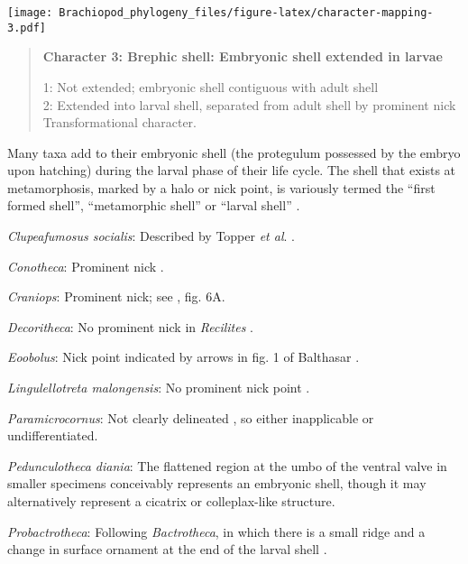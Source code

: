 \documentclass[openany]{book}
\theoremstyle{definition}
\theoremstyle{definition}
\theoremstyle{definition}
\theoremstyle{remark}
\begin{document}
\texttt{[image: Brachiopod\_phylogeny\_files/figure-latex/character-mapping-3.pdf]}

\begin{quote}
\textbf{Character 3: Brephic shell: Embryonic shell extended in larvae}

1: Not extended; embryonic shell contiguous with adult shell\\
2: Extended into larval shell, separated from adult shell by prominent
nick\\
Transformational character.
\end{quote}

Many taxa add to their embryonic shell (the protegulum possessed by the
embryo upon hatching) during the larval phase of their life cycle. The
shell that exists at metamorphosis, marked by a halo or nick point, is
variously termed the ``first formed shell'', ``metamorphic shell'' or
``larval shell'' \citep{Bassett2017Earliestontogeny}.

\hypertarget{Clupeafumosus_socialis-coding-3}{}
\emph{Clupeafumosus socialis}: Described by Topper \emph{et al}.
\citeyearpar{Topper2013Reappraisalof}.

\hypertarget{Conotheca-coding-3}{}
\emph{Conotheca}: Prominent nick \citep[figs 5G-H, 6a1]{Wrona2003}.

\hypertarget{Craniops-coding-3}{}
\emph{Craniops}: Prominent nick; see \citet{Freeman1999Changesin}, fig.
6A.

\hypertarget{Decoritheca-coding-3}{}
\emph{Decoritheca}: No prominent nick in \emph{Recilites}
\citep{Dzik1978}.

\hypertarget{Eoobolus-coding-3}{}
\emph{Eoobolus}: Nick point indicated by arrows in fig. 1 of Balthasar
\citeyearpar{Balthasar2009Thebrachiopod}.

\hypertarget{Lingulellotreta_malongensis-coding-3}{}
\emph{Lingulellotreta malongensis}: No prominent nick point
\citep{Holmer1997EarlyCambrian, Li2004}.

\hypertarget{Paramicrocornus-coding-3}{}
\emph{Paramicrocornus}: Not clearly delineated
\citep{Zhang2018Ahyolithid}, so either inapplicable or undifferentiated.

\hypertarget{Pedunculotheca_diania-coding-3}{}
\emph{Pedunculotheca diania}: The flattened region at the umbo of the
ventral valve in smaller specimens conceivably represents an embryonic
shell, though it may alternatively represent a cicatrix or
colleplax-like structure.

\hypertarget{Probactrotheca-coding-3}{}
\emph{Probactrotheca}: Following \emph{Bactrotheca}, in which there is a
small ridge and a change in surface ornament at the end of the larval
shell \citep{Dzik1980Ontogenyof}.
\end{document}
